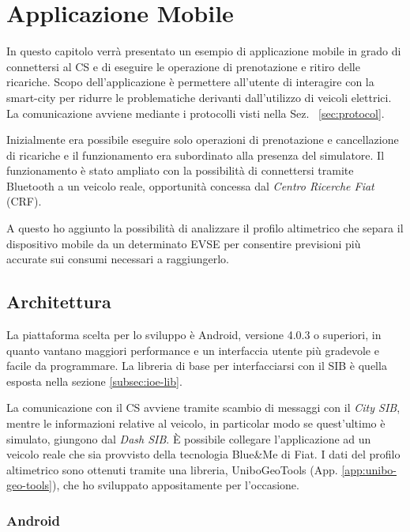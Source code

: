 \chapter{Applicazione Mobile}\label{chap:mobile-app}

In questo capitolo verrà presentato un esempio di applicazione mobile in grado di connettersi al CS e di eseguire le operazione di prenotazione e ritiro delle ricariche. Scopo dell'applicazione è permettere all'utente di interagire con la smart-city per ridurre le problematiche derivanti dall'utilizzo di veicoli elettrici. La comunicazione avviene mediante i protocolli visti nella Sez. ~\ref{sec:protocol}.

Inizialmente era possibile eseguire solo operazioni di prenotazione e cancellazione di ricariche e il funzionamento era subordinato alla presenza del simulatore. Il funzionamento è stato ampliato con la possibilità di connettersi tramite Bluetooth a un veicolo reale, opportunità concessa dal \emph{Centro Ricerche Fiat} (CRF).

A questo ho aggiunto la possibilità di analizzare il profilo altimetrico che separa il dispositivo mobile da un determinato EVSE per consentire previsioni più accurate sui consumi necessari a raggiungerlo.

\section{Architettura}

La piattaforma scelta per lo sviluppo è Android, versione 4.0.3 o superiori, in quanto vantano maggiori performance e un interfaccia utente più gradevole e facile da programmare. La libreria di base per interfacciarsi con il SIB è quella esposta nella sezione \ref{subsec:ioe-lib}.

La comunicazione con il CS avviene tramite scambio di messaggi con il \emph{City SIB}, mentre le informazioni relative al veicolo, in particolar modo se quest'ultimo è simulato, giungono dal \emph{Dash SIB}. È possibile collegare l'applicazione ad un veicolo reale che sia provvisto della tecnologia Blue\&{}Me di Fiat. I dati del profilo altimetrico sono ottenuti tramite una libreria, UniboGeoTools (App. \ref{app:unibo-geo-tools}), che ho sviluppato appositamente per l'occasione.

\subsection{Android}

